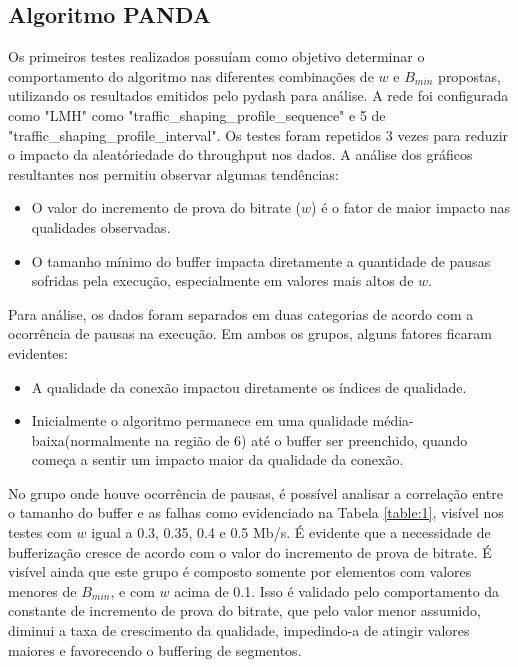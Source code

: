 \documentclass[10pt,twocolumn,letterpaper]{article}
\begin{document}
	\subsection{Algoritmo PANDA}
	Os primeiros testes realizados possuíam como objetivo determinar o comportamento do algoritmo nas diferentes combinações de $w$ e $B_{min}$ propostas, utilizando os resultados emitidos pelo pydash para análise. A rede foi configurada como "LMH" como "traffic\_shaping\_profile\_sequence" e 5 de "traffic\_shaping\_profile\_interval". Os testes foram repetidos 3 vezes para reduzir o impacto da aleatóriedade do throughput nos dados. A análise dos gráficos resultantes nos permitiu observar algumas tendências: 
	\begin{itemize}
		\item O valor do incremento de prova do bitrate ($w$) é o fator de maior impacto nas qualidades observadas. 
		\item O tamanho mínimo do buffer impacta diretamente a quantidade de pausas sofridas pela execução, especialmente em valores mais altos de $w$.
	\end{itemize}
	Para análise, os dados foram separados em duas categorias de acordo com a ocorrência de pausas na execução. Em ambos os grupos, alguns fatores ficaram evidentes:
	\begin{itemize}
		\item A qualidade da conexão impactou diretamente os índices de qualidade.
		\item Inicialmente o algoritmo permanece em uma qualidade média-baixa(normalmente na região de 6) até o buffer ser preenchido, quando começa a sentir um impacto maior da qualidade da conexão.
	\end{itemize}
	
	No grupo onde houve ocorrência de pausas, é possível analisar a correlação entre o tamanho do buffer e as falhas como evidenciado na Tabela \ref{table:1}, visível nos testes com $w$ igual a 0.3, 0.35, 0.4 e  0.5 Mb/s. É evidente que a necessidade de bufferização cresce de acordo com o valor do incremento de prova de bitrate. É visível ainda que este grupo é composto somente por elementos com valores menores de $B_{min}$, e com $w$ acima de 0.1. Isso é validado pelo comportamento da  
	constante de incremento de prova do bitrate, que pelo valor menor assumido, diminui a taxa de crescimento da qualidade, impedindo-a de atingir valores maiores e favorecendo o buffering de segmentos.
	
\end{document}
